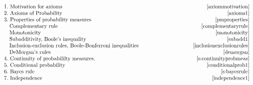 \documentclass[12pt]{article}
\begin{document}

$
\begin{array}{lr}
1.\mbox{ Motivation for axioms}\hskip 2.55 in & \qquad\qquad\qquad\ \ \ \ \pageref{axiommotivation} \\
2.\mbox{ Axioms of Probability} & \pageref{axioms1}\\
3.\mbox{ Properties of probability measures} & \pageref{pmproperties}\\
\ \ \mbox{ Complementary rule} & \pageref{complementaryrule}\\
\ \ \mbox{ Monotonicity} & \pageref{monotonicity}\\
\ \ \mbox{ Subadditivity, Boole's inequality} & \pageref{subadd1}\\
\ \ \mbox{ Inclusion-exclusion rules, Boole-Bonferroni inequalities} & \pageref{inclusionexclusionrules}\\
\ \ \mbox{ DeMorgan's rules} & \pageref{demorgan}\\
4.\mbox{ Continuity of probabililty measures.} & \pageref{s:continuityprobmeas}\\
5.\mbox{ Conditional probability} & \pageref{conditionalprob1}\\
6.\mbox{ Bayes rule} & \pageref{s:bayesrule}\\
7.\mbox{ Independence} & \pageref{independence1}\\
\end{array}
$
\bigskip

\newpage


\end{document}
